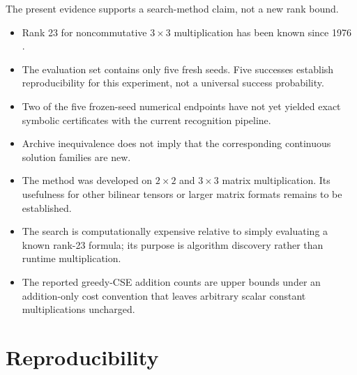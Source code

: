 \documentclass[11pt]{article}
\begin{document}
The present evidence supports a search-method claim, not a new rank bound.
\begin{itemize}[leftmargin=1.5em]
    \item Rank 23 for noncommutative $3\times3$ multiplication has been known since 1976 \cite{laderman1976}.
    \item The evaluation set contains only five fresh seeds.  Five successes establish reproducibility for this experiment, not a universal success probability.
    \item Two of the five frozen-seed numerical endpoints have not yet yielded exact symbolic certificates with the current recognition pipeline.
    \item Archive inequivalence does not imply that the corresponding continuous solution families are new.
    \item The method was developed on $2\times2$ and $3\times3$ matrix multiplication.  Its usefulness for other bilinear tensors or larger matrix formats remains to be established.
    \item The search is computationally expensive relative to simply evaluating a known rank-23 formula; its purpose is algorithm discovery rather than runtime multiplication.
    \item The reported greedy-CSE addition counts are upper bounds under an addition-only cost convention that leaves arbitrary scalar constant multiplications uncharged.
\end{itemize}

\section{Reproducibility}
\end{document}
